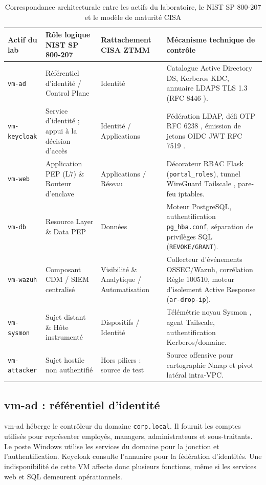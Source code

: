 \documentclass[a4paper,12pt]{report}
\begin{document}
\begin{table}[H]\centering\small
\caption{Correspondance architecturale entre les actifs du laboratoire, le NIST SP 800-207 et le modèle de maturité CISA}
\label{tab:nist-mapping}
\begin{tabularx}{\textwidth}{p{2.3cm}p{2.8cm}p{2.9cm}Y}\toprule
\textbf{Actif du lab} & \textbf{Rôle logique NIST SP 800-207} & \textbf{Rattachement CISA ZTMM \cite{cisa_ztmm}} & \textbf{Mécanisme technique de contrôle}\\\midrule
\texttt{vm-ad} & Référentiel d'identité / Control Plane & Identité & Catalogue Active Directory DS, Kerberos KDC, annuaire LDAPS TLS 1.3 (RFC 8446 \cite{rfc8446}).\\
\texttt{vm-keycloak} & Service d’identité ; appui à la décision d’accès & Identité / Applications & Fédération LDAP, défi OTP RFC 6238 \cite{rfc6238}, émission de jetons OIDC JWT RFC 7519 \cite{rfc7519}.\\
\texttt{vm-web} & Application PEP (L7) \& Routeur d'enclave & Applications / Réseau & Décorateur RBAC Flask (\texttt{portal\_roles}), tunnel WireGuard Tailscale \cite{wireguard}, pare-feu iptables.\\
\texttt{vm-db} & Resource Layer \& Data PEP & Données & Moteur PostgreSQL, authentification \texttt{pg\_hba.conf}, séparation de privilèges SQL (\texttt{REVOKE/GRANT}).\\
\texttt{vm-wazuh} & Composant CDM / SIEM centralisé & Visibilité \& Analytique / Automatisation & Collecteur d'événements OSSEC/Wazuh, corrélation Règle 100510, moteur d'isolement Active Response (\texttt{ar-drop-ip}).\\
\texttt{vm-sysmon} & Sujet distant \& Hôte instrumenté & Dispositifs / Identité & Télémétrie noyau Sysmon \cite{sysmon}, agent Tailscale, authentification Kerberos/domaine.\\
\texttt{vm-attacker} & Sujet hostile non authentifié & Hors piliers : source de test & Source offensive pour cartographie Nmap et pivot latéral intra-VPC.\\\bottomrule
\end{tabularx}\end{table}

\subsection{vm-ad : référentiel d'identité}
vm-ad héberge le contrôleur du domaine \texttt{corp.local}. Il fournit les comptes utilisés pour représenter employés, managers, administrateurs et sous-traitants. Le poste Windows utilise les services du domaine pour la jonction et l'authentification. Keycloak consulte l'annuaire pour la fédération d'identités. Une indisponibilité de cette VM affecte donc plusieurs fonctions, même si les services web et SQL demeurent opérationnels.
\end{document}
